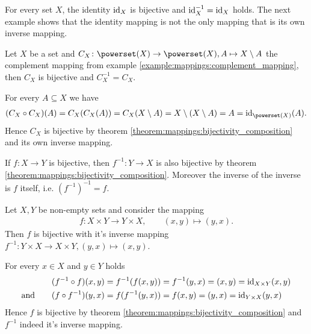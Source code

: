 \begin{examples}
    \begin{exampleenumerate}
        \item For every set $X$, the identity $\text{id}_X$ is bijective and $\text{id}_X^{-1}=\text{id}_X$ holds. The next example shows that the identity mapping is not the only mapping that is its own inverse mapping.
        \item Let $X$ be a set and $C_X\colon \powerset(X)\rightarrow\powerset(X),A\mapsto X\setminus A$ the complement mapping from example \ref{example:mappings:complement_mapping}, then $C_X$ is bijective and $C_X^{-1}=C_X$.
        \begin{miniproof}
            For every $A\subseteq X$ we have \begin{align}(C_X\circ C_X)(A)=C_X(C_X(A))=C_X(X\setminus A)=X\setminus(X\setminus A)=A=\idmap_{\powerset(X)}(A).\end{align}
            Hence $C_X$ is bijective by theorem \ref{theorem:mappings:bijectivity_composition} and its own inverse mapping.
        \end{miniproof}
        \item If $f\colon X\rightarrow Y$ is bijective, then $f^{-1}\colon Y\rightarrow X$ is also bijective by theorem \ref{theorem:mappings:bijectivity_composition}. Moreover the inverse of the inverse is $f$ itself, i.e. $(f^{-1})^{-1}=f$.
        \item\label{example:mappings:cross_product_bijective} Let $X,Y$ be non-empty sets and consider the mapping \begin{align}f\colon X\times Y\rightarrow Y\times X,\qquad (x,y)\mapsto (y,x).\end{align}
        Then $f$ is bijective with it's inverse mapping $f^{-1}\colon Y\times X\rightarrow X\times Y, (y,x)\mapsto (x,y)$.
        \begin{miniproof}
            For every $x\in X$ and $y\in Y$ holds
            \begin{align}\begin{split}(f^{-1}\circ f)(x,y)&=f^{-1}(f(x,y))=f^{-1}(y,x)=(x,y)=\text{id}_{X\times Y}(x,y)\\ \text{and}\qquad (f\circ f^{-1})(y,x)&=f(f^{-1}(y,x))=f(x,y)=(y,x)=\text{id}_{Y\times X}(y,x)\end{split}\end{align}
            Hence $f$ is bijective by theorem \ref{theorem:mappings:bijectivity_composition} and $f^{-1}$ indeed it's inverse mapping.
        \end{miniproof}
    \end{exampleenumerate}
\end{examples}

